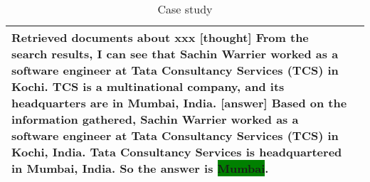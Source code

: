 \begin{table*}[htbp]
{\begin{tabular}{m{2.5cm}m{16cm}}
{    Retrieved documents about xxx\newline
    \colorbox{blue!10}{[thought]} From the search results, I can see that Sachin Warrier worked as a software engineer at Tata Consultancy Services (TCS) in Kochi. TCS is a multinational company, and its headquarters are in Mumbai, India. \newline
    \colorbox{blue!10}{[answer]} Based on the information gathered, Sachin Warrier worked as a software engineer at Tata Consultancy Services (TCS) in Kochi, India. Tata Consultancy Services is headquartered in Mumbai, India. So the answer is \colorbox{green}{Mumbai}.
    } \\
    \bottomrule
    \end{tabular}}
    \caption{Case study}
  \label{tab:casestudy}
\end{table*}

